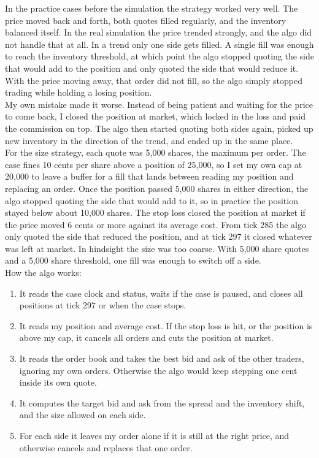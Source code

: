 \documentclass{article}
\begin{document}
In the practice cases before the simulation the strategy worked very well. The price moved back and forth, both quotes filled regularly, and the inventory balanced itself. In the real simulation the price trended strongly, and the algo did not handle that at all. In a trend only one side gets filled. A single fill was enough to reach the inventory threshold, at which point the algo stopped quoting the side that would add to the position and only quoted the side that would reduce it. With the price moving away, that order did not fill, so the algo simply stopped trading while holding a losing position.\\

\noindent My own mistake made it worse. Instead of being patient and waiting for the price to come back, I closed the position at market, which locked in the loss and paid the commission on top. The algo then started quoting both sides again, picked up new inventory in the direction of the trend, and ended up in the same place. \\

\noindent For the size strategy, each quote was 5{,}000 shares, the maximum per order. The case fines 10 cents per share above a position of 25{,}000, so I set my own cap at 20{,}000 to leave a buffer for a fill that lands between reading my position and replacing an order. Once the position passed 5{,}000 shares in either direction, the algo stopped quoting the side that would add to it, so in practice the position stayed below about 10{,}000 shares. The stop loss closed the position at market if the price moved 6 cents or more against its average cost. From tick 285 the algo only quoted the side that reduced the position, and at tick 297 it closed whatever was left at market. In hindsight the size was too coarse. With 5{,}000 share quotes and a 5{,}000 share threshold, one fill was enough to switch off a side.\\

\noindent How the algo works:
\begin{enumerate}
  \item It reads the case clock and status, waits if the case is paused, and closes all positions at tick 297 or when the case stops.
  \item It reads my position and average cost. If the stop loss is hit, or the position is above my cap, it cancels all orders and cuts the position at market.
  \item It reads the order book and takes the best bid and ask of the other traders, ignoring my own orders. Otherwise the algo would keep stepping one cent inside its own quote.
  \item It computes the target bid and ask from the spread and the inventory shift, and the size allowed on each side.
  \item For each side it leaves my order alone if it is still at the right price, and otherwise cancels and replaces that one order.
\end{enumerate}\\
\end{document}
